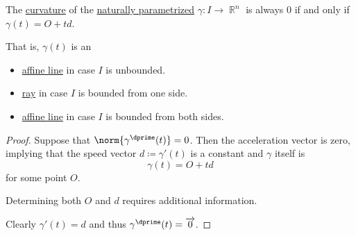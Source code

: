 \begin{proposition}\label{thm:line_curvature}
  The \hyperref[def:regular_curve_curvature]{curvature} of the \hyperref[thm:natural_reparametrization_existence]{naturally parametrized} \( \gamma: I \to \BbbR^n \) is always \( 0 \) if and only if \( \gamma(t) = O + td \).

  That is, \( \gamma(t) \) is an
  \begin{itemize}
    \item \hyperref[def:affine_line]{affine line} in case \( I \) is unbounded.
    \item \hyperref[def:geometric_ray]{ray} in case \( I \) is bounded from one side.
    \item \hyperref[def:affine_line]{affine line} in case \( I \) is bounded from both sides.
  \end{itemize}
\end{proposition}
\begin{proof}
  \SufficiencySubProof Suppose that \( \norm{\gamma^\dprime(t)} = 0 \). Then the acceleration vector is zero, implying that the speed vector \( d \coloneqq \gamma'(t) \) is a constant and \( \gamma \) itself is
  \begin{equation*}
    \gamma(t) = O + t d
  \end{equation*}
  for some point \( O \).

  Determining both \( O \) and \( d \) requires additional information.

  \NecessitySubProof Clearly \( \gamma'(t) = d \) and thus \( \gamma^\dprime(t) = \vect 0 \).
\end{proof}

